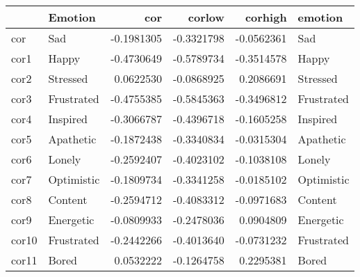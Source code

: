 
\begin{tabular}{l|l|r|r|r|l}
\hline
  & Emotion & cor & corlow & corhigh & emotion\\
\hline
cor & Sad & -0.1981305 & -0.3321798 & -0.0562361 & Sad\\
\hline
cor1 & Happy & -0.4730649 & -0.5789734 & -0.3514578 & Happy\\
\hline
cor2 & Stressed & 0.0622530 & -0.0868925 & 0.2086691 & Stressed\\
\hline
cor3 & Frustrated & -0.4755385 & -0.5845363 & -0.3496812 & Frustrated\\
\hline
cor4 & Inspired & -0.3066787 & -0.4396718 & -0.1605258 & Inspired\\
\hline
cor5 & Apathetic & -0.1872438 & -0.3340834 & -0.0315304 & Apathetic\\
\hline
cor6 & Lonely & -0.2592407 & -0.4023102 & -0.1038108 & Lonely\\
\hline
cor7 & Optimistic & -0.1809734 & -0.3341258 & -0.0185102 & Optimistic\\
\hline
cor8 & Content & -0.2594712 & -0.4083312 & -0.0971683 & Content\\
\hline
cor9 & Energetic & -0.0809933 & -0.2478036 & 0.0904809 & Energetic\\
\hline
cor10 & Frustrated & -0.2442266 & -0.4013640 & -0.0731232 & Frustrated\\
\hline
cor11 & Bored & 0.0532222 & -0.1264758 & 0.2295381 & Bored\\
\hline
\end{tabular}
